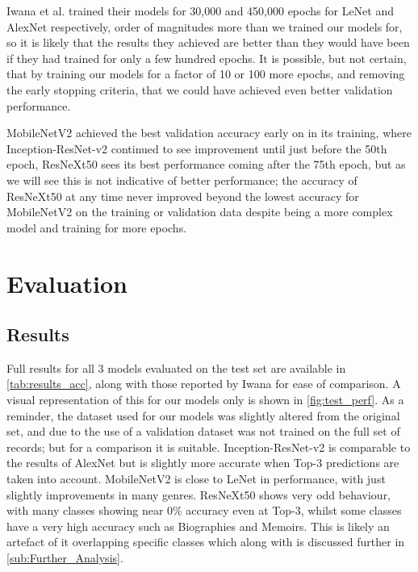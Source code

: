 \documentclass[12pt]{article}
\numberwithin{equation}{section}
\numberwithin{figure}{section}
\begin{document}
Iwana et al. trained their models for 30,000 and 450,000 epochs for LeNet and AlexNet respectively, order of magnitudes more than we trained our models for, so it is likely that the results they achieved are better than they would have been if they had trained for only a few hundred epochs. It is possible, but not certain, that by training our models for a factor of 10 or 100 more epochs, and removing the early stopping criteria, that we could have achieved even better validation performance. 

MobileNetV2 achieved the best validation accuracy early on in its training, where Inception-ResNet-v2 continued to see improvement until just before the 50th epoch, ResNeXt50 sees its best performance coming after the 75th epoch, but as we will see this is not indicative of better performance; the accuracy of ResNeXt50 at any time never improved beyond the lowest accuracy for MobileNetV2 on the training or validation data despite being a more complex model and training for more epochs.


\section{Evaluation} 
\label{sec:Evaluation_and_Further_Exploration} 
\subsection{Results} 
\label{sub:Results} 
Full results for all 3 models evaluated on the test set are available in \cref{tab:results_acc}, along with those reported by Iwana for ease of comparison. A visual representation of this for our models only is shown in \cref{fig:test_perf}. As a reminder, the dataset used for our models was slightly altered from the original set, and due to the use of a validation dataset was not trained on the full set of records; but for a comparison it is suitable. Inception-ResNet-v2 is comparable to the results of AlexNet but is slightly more accurate when Top-3 predictions are taken into account. MobileNetV2 is close to LeNet in performance, with just slightly improvements in many genres. ResNeXt50 shows very odd behaviour, with many classes showing near 0\% accuracy even at Top-3, whilst some classes have a very high accuracy such as Biographies and Memoirs. This is likely an artefact of it overlapping specific classes which along with is discussed further in \cref{sub:Further_Analysis}.
\end{document}

